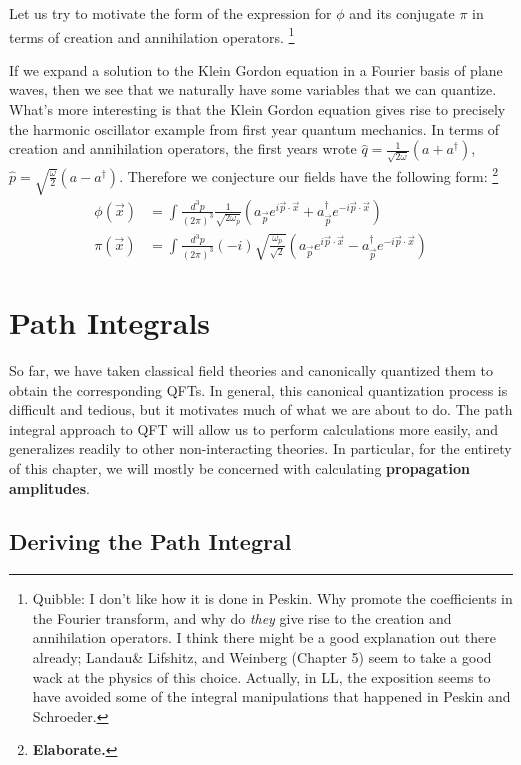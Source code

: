 \documentclass{report}
\theoremstyle{plain}
\theoremstyle{definition}
\theoremstyle{remark}
\newcommand{\FR}[2]{\frac{#1}{#2}}
\newcommand{\SFR}[2]{\sqrt{\frac{#1}{#2}}}
\newcommand{\om}{\omega}
\newcommand{\elaborate}{{\color{blue} \textbf{Elaborate.}}}
\begin{document}
Let us try to motivate the form of the expression for $\phi$ and its
conjugate $\pi$ in terms of creation and annihilation operators.
\footnote{Quibble: I don't like how it is done in Peskin. Why promote the
coefficients in the Fourier transform, and why do \emph{they} give rise to
the creation and annihilation operators. I think there might be a good
explanation out there already; Landau\& Lifshitz, and Weinberg (Chapter 5) seem to take
a good wack at the physics of this choice. Actually, in LL, the exposition
seems to have avoided some of the integral manipulations that happened in
Peskin and Schroeder.}

If we expand a solution to the Klein Gordon equation in a Fourier basis of
plane waves, then we see that we naturally have some variables that we can
quantize. What's more interesting is that the Klein Gordon equation gives
rise to precisely the harmonic oscillator example from first year quantum
mechanics. In terms of creation and annihilation operators, the first years
wrote $\hat q = \FR{1}{\sqrt{2\om}}(a+a^\dag)$, $\hat p =
\SFR{\om}{2}(a-a^\dag)$. Therefore we conjecture our fields have the
following form: \footnote{{\elaborate}}
\newcommand{\vp}{{\vec p}}
\newcommand{\vx}{{\vec x}}
\begin{align*}
\phi(\vx) &= \int \FR{d^3p}{(2\pi)^3} \FR{1}{\sqrt{2\om_p}} (a_\vp e^{i\vp\cdot\vx} + a_\vp^\dag e^{-i\vp\cdot\vx})\\
\pi(\vx) &= \int \FR{d^3p}{(2\pi)^3}(-i)\SFR{\om_p}{\sqrt2} (a_\vp e^{i\vp\cdot\vx} - a_\vp^\dag e^{-i\vp\cdot\vx})
\end{align*}

\chapter{Path Integrals}

So far, we have taken classical field theories and canonically
quantized them to obtain the corresponding QFTs. In general, this
canonical quantization process is difficult and tedious, but it
motivates much of what we are about to do. The path integral approach
to QFT will allow us to perform calculations more easily, and
generalizes readily to other non-interacting theories. In particular,
for the entirety of this chapter, we will mostly be concerned with
calculating {\bf propagation amplitudes}.

\section{Deriving the Path Integral}
\end{document}
